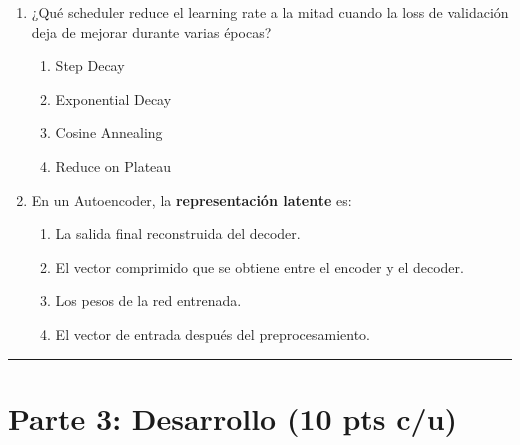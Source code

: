 \documentclass[12pt,a4paper]{article}
\begin{document}
\begin{enumerate}[label=\arabic*)]
    \item ¿Qué scheduler reduce el learning rate a la mitad cuando la loss de validación deja de mejorar durante varias épocas?
    \begin{enumerate}[label=\Alph*)]
        \item Step Decay
        \item Exponential Decay
        \item Cosine Annealing
        \item Reduce on Plateau
    \end{enumerate}

    \item En un Autoencoder, la \textbf{representación latente} es:
    \begin{enumerate}[label=\Alph*)]
        \item La salida final reconstruida del decoder.
        \item El vector comprimido que se obtiene entre el encoder y el decoder.
        \item Los pesos de la red entrenada.
        \item El vector de entrada después del preprocesamiento.
    \end{enumerate}
\end{enumerate}

\vspace{0.5cm}
\hrule
\vspace{0.5cm}

\section*{Parte 3: Desarrollo (10 pts c/u)}
\end{document}
